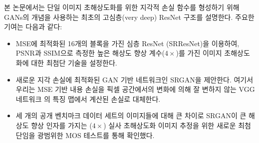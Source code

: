 \documentclass[10pt,twocolumn,letterpaper]{article}
\newcommand{\kor}[1]{#1}
\newcommand{\eng}[1]{}
\begin{document}
\eng{
In this paper we describe the first very deep \ac{ResNet} \cite{he2015deep,he2016identity} architecture using the concept of \acp{GAN} to form a perceptual loss function for photo-realistic \ac{SISR}. Our main contributions are:
}\kor{
본 논문에서는 \ac{단일 이미지 초해상도화}를 위한 지각적 손실 함수를 형성하기 위해 \acp{GAN}의 개념을 사용하는 최초의 고심층(very deep) \ac{ResNet} \cite{he2015deep,he2016identity} 구조를 설명한다. 주요한 기여는 다음과 같다:
}
\begin{itemize}
\item \eng{
We set a new state of the art for image \ac{SR} with high upscaling factors ($4\times$) as measured by \ac{PSNR} and \ac{SSIM} with our 16 blocks deep \ac{ResNet} (SRResNet) optimized for \ac{MSE}.
}\kor{
\ac{MSE}에 최적화된 16개의 블록을 가진 심층 \ac{ResNet} (SRResNet)을 이용하여, \ac{PSNR}과 \ac{SSIM}으로 측정한 높은 해상도 향상 계수($4\times$)를 가진 이미지 초해상도화에 대한 최첨단 기술을 설정한다.
} %
\item \eng{
We propose SRGAN which is a \ac{GAN}-based network optimized for a new perceptual loss. Here we replace the \ac{MSE}-based content loss with a loss calculated on feature maps of the VGG network \cite{simonyan2014very}, which are more invariant to changes in pixel space \cite{Li2016}.
}\kor{
새로운 지각 손실에 최적화된 \ac{GAN} 기반 네트워크인 SRGAN을 제안한다. 여기서 우리는 \ac{MSE} 기반 내용 손실을 픽셀 공간\cite{Li2016}에서의 변화에 의해 잘 변하지 않는 VGG 네트워크 \cite{simonyan2014very}의 특징 맵에서 계산된 손실로 대체한다.
} %
\item \eng{
We confirm with an extensive \ac{MOS} test on images from three public benchmark datasets that SRGAN is the new state of the art, by a large margin, for the estimation of photo-realistic \ac{SR} images with high upscaling factors ($4\times$).
}\kor{
세 개의 공개 벤치마크 데이터 세트의 이미지들에 대해 큰 차이로 SRGAN이 큰 해상도 향상 인자를 가지는 ($4\times$) 실사 \ac{초해상도화} 이미지 추정을 위한 새로운 최첨단임을 광범위한 \ac{MOS} 테스트를 통해 확인했다.
}
\end{itemize}
\end{document}
